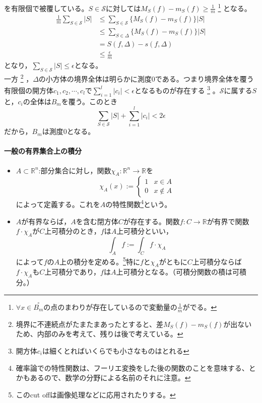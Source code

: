 \documentclass[dvipdfmx,a4j,10pt]{jsarticle}
\makeatletter
\theoremstyle{mystyle1}
\theoremstyle{mystyle2}
\renewenvironment{proof}[1][\proofname]{\par
  \pushQED{\qed}%
  \normalfont
  \topsep6\p@\@plus6\p@ \trivlist
  \item[\hskip\labelsep{\bfseries\sffamily #1}]\ignorespaces
}{%
  \popQED\endtrivlist\@endpefalse
}
\renewcommand\proofname{証明}
\makeatother
\begin{document}
\begin{proof}
{    }
    を有限個で被覆している。$S\in\mathscr{S}$に対しては$\displaystyle M_S(f)-m_S(f)\geq\frac{1}{m}$
    \footnote{
    $\forall x\in\overset{\circ}{B_m}$の点のまわりが存在しているので変動量の$\frac{1}{m}$がでる。
    }
    となる。
	\[
	\begin{split}
		\frac{1}{m}\sum_{S\in\mathscr{S}}|S|
		&\leq\sum_{S\in\mathscr{S}}\{M_S(f)-m_S(f)\}|S| \\
		&\leq\sum_{S\in\Delta}\{M_S(f)-m_S(f)\}|S| \\
		&= S(f,\Delta)-s(f,\Delta) \\
		&\leq\frac{\epsilon}{m}
	\end{split}
	\]
	となり，$\displaystyle\sum_{S\in\mathscr{S}}|S|\leq\epsilon$となる。\\
	一方
    \footnote{
    境界に不連続点がたまたまあったとすると、差$M_S(f)-m_S(f)$が出ないため、内部のみを考えて、残りは後で考えている。
    }
    ，$\Delta$の小方体の境界全体は明らかに測度$0$である。つまり境界全体を覆う有限個の開方体$c_1,c_2,\cdots,c_l$で$\displaystyle \sum_{i=1}^l|c_i|<\epsilon$となるものが存在する
    \footnote{開方体$c_i$は細くとればいくらでも小さなものはとれる
    }
    。$\mathscr{S}$に属する$S$と，$c_i$の全体は$B_m$を覆う。このとき
	\[
	\sum_{S\in\mathscr{S}}|S|+\sum_{i=1}^l|c_i|<2\epsilon
	\]
	だから，$B_m$は測度$0$となる。
\end{proof}

\paragraph{一般の有界集合上の積分}
\begin{itemize}
	\item $A\subset\mathbb{R}^n$:部分集合に対し，関数$\chi_A:\mathbb{R}^n\to\mathbb{R}$を
	\[
		\chi_A(x):=
		\begin{cases}
			1 & x\in A\\
			0 & x\notin A
		\end{cases}
	\]
	によって定義する。これを$A$の特性関数\footnote{確率論での特性関数は、フーリエ変換をした後の関数のことを意味する、とかもあるので、数学の分野による名前のそれに注意。}という。
	\item $A$が有界ならば，$A$を含む閉方体$C$が存在する。関数$f:C\to\mathbb{R}$が有界で関数$f\cdot\chi_A$が$C$上可積分のとき，$f$は$A$上可積分といい，
	\[
		\int_A f := \int_C f\cdot\chi_A
	\]
	によって$f$の$A$上の積分を定める。\footnote{このcut offは画像処理などに応用されたりする。}特に$f$と$\chi_A$がともに$C$上可積分ならば$f\cdot\chi_A$も$C$上可積分であり，$f$は$A$上可積分となる。（可積分関数の積は可積分。）
\end{itemize}
\end{document}
